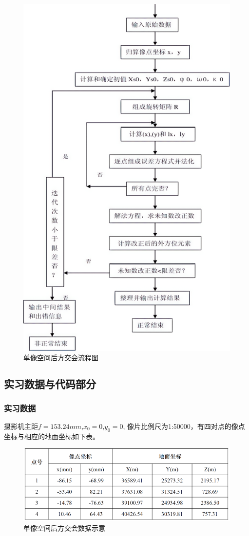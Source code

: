 \documentclass[12pt,hyperref,a4paper,UTF8]{ctexart}
\begin{document}
    \begin{figure}[!htbp]
        \centering
        \includegraphics[width=0.6\linewidth]{figures/单像流程.png}
        \caption{单像空间后方交会流程图}
        \label{fig:原理}
    \end{figure}
    \FloatBarrier

\subsection{实习数据与代码部分}

\subsubsection{实习数据}    

摄影机主距$f=153.24mm$,$x_0=0$,$y_0=0$, 像片比例尺为1:50000，有四对点的像点坐标与相应的地面坐标如下表。
\begin{figure}[!htbp]
    \centering
    \includegraphics[width=1.0\linewidth]{figures/单像数据.png}
    \caption{单像空间后方交会数据示意}
    \label{fig:数据}
\end{figure}
\FloatBarrier
\end{document}

